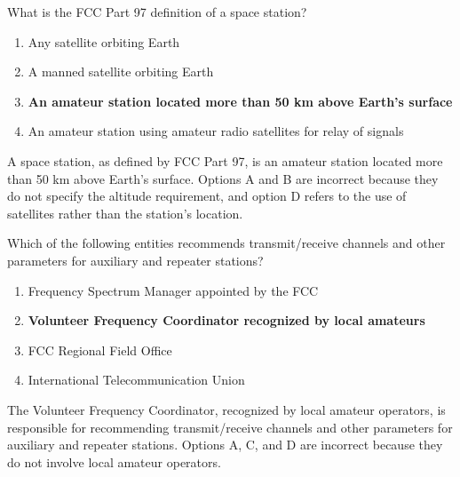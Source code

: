 
\begin{tcolorbox}[colback=gray!10!white,colframe=black!75!black,title={T1A07}]
    What is the FCC Part 97 definition of a space station?
    \begin{enumerate}[label=\Alph*),noitemsep]
        \item Any satellite orbiting Earth
        \item A manned satellite orbiting Earth
        \item \textbf{An amateur station located more than 50 km above Earth's surface}
        \item An amateur station using amateur radio satellites for relay of signals
    \end{enumerate}
\end{tcolorbox}
A space station, as defined by FCC Part 97, is an amateur station located more than 50 km above Earth's surface. Options A and B are incorrect because they do not specify the altitude requirement, and option D refers to the use of satellites rather than the station's location.


\begin{tcolorbox}[colback=gray!10!white,colframe=black!75!black,title={T1A08}]
    Which of the following entities recommends transmit/receive channels and other parameters for auxiliary and repeater stations?
    \begin{enumerate}[label=\Alph*),noitemsep]
        \item Frequency Spectrum Manager appointed by the FCC
        \item \textbf{Volunteer Frequency Coordinator recognized by local amateurs}
        \item FCC Regional Field Office
        \item International Telecommunication Union
    \end{enumerate}
\end{tcolorbox}
The Volunteer Frequency Coordinator, recognized by local amateur operators, is responsible for recommending transmit/receive channels and other parameters for auxiliary and repeater stations. Options A, C, and D are incorrect because they do not involve local amateur operators.


